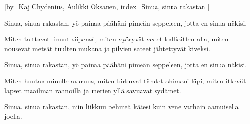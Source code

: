 [by={Kaj Chydenius, Aulikki Oksanen},
index={Sinua, sinua rakastan}
]

\beginchorus
Sinua, sinua rakastan,
yö painaa päähäni pimeän seppeleen,
jotta en sinua näkisi.
\endchorus

\beginverse
Miten taittavat linnut siipensä,
miten vyöryvät vedet kallioitten alla,
miten nousevat metsät tuulten mukana
ja pilvien sateet jähtettyvät kiveksi.
\endverse

\beginchorus
Sinua, sinua rakastan,
yö painaa päähäni pimeän seppeleen,
jotta en sinua näkisi.
\endchorus

\beginverse
Miten huutaa minulle avaruus,
miten kirkuvat tähdet ohimoni läpi,
miten itkevät lapset maailman rannoilla
ja merien yllä savuavat sydämet.
\endverse

\beginchorus
Sinua, sinua rakastan,
niin liikkuu pehmeä kätesi
kuin vene varhain aamuisella joella.
\endchorus

\endsong